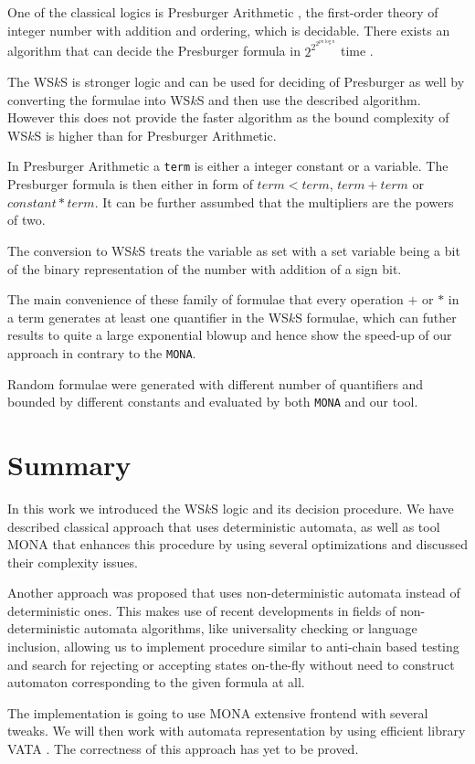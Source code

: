 One of the classical logics is Presburger Arithmetic \cite{pres}, the
first-order theory of integer number with addition and ordering, which is
decidable. There exists an algorithm that can decide the Presburger formula in
$2^{2^{2^{pn\log n}}}$ time \cite{pres-time}. 

The WS$k$S is stronger logic and can be used for deciding of Presburger as well
by converting the formulae into WS$k$S and then use the described algorithm.
However this does not provide the faster algorithm as the bound complexity of
WS$k$S is higher than for Presburger Arithmetic. 

In Presburger Arithmetic a \texttt{term} is either a integer constant or a
variable. The Presburger formula is then either in form of $term < term$, $term
+ term$ or $constant * term$. It can be further assumbed that the multipliers
are the powers of two.

The conversion to WS$k$S treats the variable as set with a set variable being a
bit of the binary representation of the number with addition of a sign bit.

The main convenience of these family of formulae that every operation $+$ or $*$
in a term generates at least one quantifier in the WS$k$S formulae, which can
futher results to quite a large exponential blowup and hence show the speed-up
of our approach in contrary to the \texttt{MONA}.

Random formulae were generated with different number of quantifiers and bounded
by different constants and evaluated by both \texttt{MONA} and our tool. 

\chapter{Summary}\label{summary}

In this work we introduced the WS$k$S logic and its decision procedure. We have
described classical approach that uses deterministic automata, as well as tool
\textsc{MONA} that enhances this procedure by using several optimizations and
discussed their complexity issues.

Another approach was proposed that uses non-deterministic automata instead of
deterministic ones. This makes use of recent developments in fields of
non-deterministic automata algorithms, like universality checking or language
inclusion, allowing us to implement procedure similar to anti-chain based
testing \cite{tacas} and search for rejecting or accepting states on-the-fly
without need to construct automaton corresponding to the given formula at all.

The implementation is going to use \textsc{MONA} extensive frontend with several
tweaks. We will then work with automata representation by using efficient
library \textsc{VATA} \cite{vata}. The correctness of this approach has yet to
be proved.

